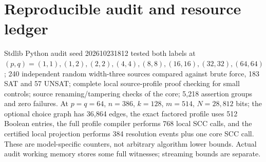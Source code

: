 \documentclass[11pt]{article}
\begin{document}
\section{Reproducible audit and resource ledger}
Stdlib Python audit seed 202610231812 tested both labels at $(p,q)=(1,1),(1,2),(2,2),(4,4),(8,8),(16,16),(32,32),(64,64)$; 240 independent random width-three sources compared against brute force, 183 SAT and 57 UNSAT; complete local source-profile proof checking for small controls; source renaming/tampering checks of the core; 5,218 assertion groups and zero failures. At $p=q=64$, $n=386$, $k=128$, $m=514$, $N=28,812$ bits; the optional choice graph has 36,864 edges, the exact factored profile uses 512 Boolean entries, the full profile compiler performs 768 local SCC calls, and the certified local projection performs 384 resolution events plus one core SCC call. These are model-specific counters, not arbitrary algorithm lower bounds. Actual audit working memory stores some full witnesses; streaming bounds are separate.
\end{document}
